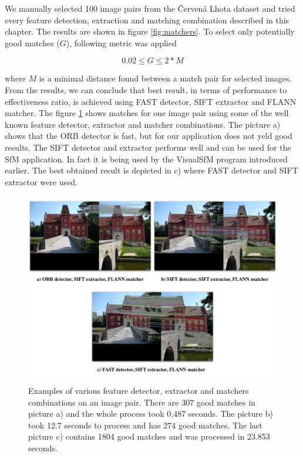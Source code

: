 We manually selected 100 image pairs from the Červená Lhota dataset and tried every feature detection, extraction and matching combination described in this chapter. The results are shown in figure \ref{fig:matchers}. To select only potentially good matches ($G$), following metric was applied

\begin{equation}
	0.02 \leq G \leq 2* M
\end{equation}

where $M$ is a minimal distance found between a match pair for selected images. From the results, we can conclude that best result, in terms of performance to effectiveness ratio, is achieved using FAST detector, SIFT extractor and FLANN matcher. The figure \ref{fig:matches} shows matches for one image pair using some of the well known feature detector, extractor and matcher combinations. The picture a) shows that the ORB detector is fast, but for our application does not yeld good results. The SIFT detector and extractor performs well and can be used for the SfM application. In fact it is being used by the VisualSfM program introduced earlier. The best obtained result is depicted in c) where FAST detector and SIFT extractor were used.

\begin{figure}[ht]
	\begin{center}
		\includegraphics[keepaspectratio,width=\textwidth]{fig/matches.pdf}
	\end{center}
	\caption{Examples of various feature detector, extractor and matchers combinations on an image pair. There are 307 good matches in picture a) and the whole process took 0,487 seconds. The picture b) took 12.7 seconds to process and has 274 good matches. The last picture c) contains 1804 good matches and was processed in 23.853 seconds.}
	\label{fig:matches}
\end{figure}

